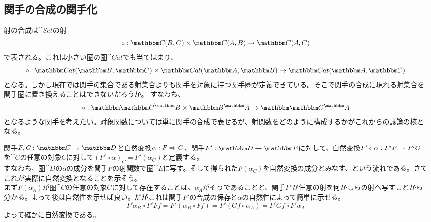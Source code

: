 \subsection{関手の合成の関手化}
  射の合成は$\cat{Set}$の射\[\mor{\circ}{\arset{C}{B}{C}\times\arset{C}{A}{B}}{\arset{C}{A}{C}}\]で表される。これは小さい圏の圏$\cat{Cat}$でも当てはまり、\[\mor{\circ}{\arset{Cat}{\cat{B}}{\cat{C}}\times\arset{Cat}{\cat{A}}{\cat{B}}}{\arset{Cat}{\cat{A}}{\cat{C}}}\]となる。しかし現在では関手の集合である射集合よりも関手を対象に持つ関手圏が定義できている。そこで関手の合成に現れる射集合を関手圏に置き換えることはできないだろうか。
  すなわち、\[\functor{\circ}{\funccat{B}{C}\times\funccat{A}{B}}{\funccat{A}{C}}\]となるような関手を考えたい。対象関数については単に関手の合成で表せるが、射関数をどのように構成するかがこれからの議論の核となる。
  \begin{define}[自然変換と関手の合成]
    関手$\functor{F,G}{C}{D}$と自然変換$\alpha:F\Rightarrow G$、関手$\functor{F'}{D}{E}$に対して、自然変換$F'\circ\alpha:F'F\Rightarrow F'G$を$\cat{C}$の任意の対象$C$に対して$(F'\circ\alpha)_C=F'(\alpha_C)$と定義する。\\
    すなわち、圏$\cat{D}$の$\alpha$の成分を関手$F$の射関数で圏$\cat{E}$に写す。そして得られた$F(\alpha_C)$を自然変換の成分とみなす、という流れである。さてこれが実際に自然変換となることを示そう。\\
    まず$F(\alpha_A)$が圏$\cat{C}$の任意の対象$C$に対して存在することは、$\alpha_A$がそうであることと、関手$F'$が任意の射を何かしらの射へ写すことから分かる。よって後は自然性を示せば良い。だがこれは関手$F'$の合成の保存と$\alpha$の自然性によって簡単に示せる。
    \[F'\alpha_B\circ F'Ff=F'(\alpha_B\circ Ff)=F'(Gf\circ\alpha_A)=F'Gf\circ F'\alpha_A\]よって確かに自然変換である。
    \begin{center}
\end{center}
\end{define}
